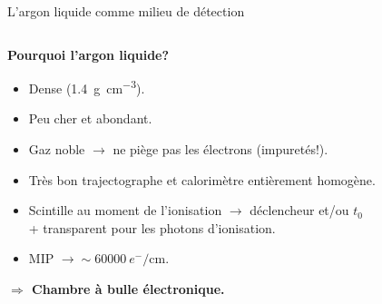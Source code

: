 \begin{frame}{L'argon liquide comme milieu de détection}
\begin{scriptsize}
\begin{columns}
\begin{column}{0.4\textwidth}
\begin{footnotesize}
           				\textbf{Pourquoi l'argon liquide?}
           			\end{footnotesize}
           			\begin{itemize}
           				\item Dense (\SI{1.4}{\gram\per\centi\meter^3}).
           				\item Peu cher et abondant.
           				\item Gaz noble $\rightarrow$ ne piège pas les électrons (\danger impuretés!).
           				\item Très bon trajectographe et calorimètre entièrement homogène.
           				\item Scintille au moment de l'ionisation $\rightarrow$ déclencheur et/ou $t_0$ \\ + transparent pour les photons  d'ionisation.
         				\item MIP $\rightarrow\sim\SI{60000}{e^-\per\centi\meter}$. \\
           			\end{itemize}
           			\begin{footnotesize}
       	    			\textbf{$\Rightarrow$ Chambre à bulle électronique.}
       	    		\end{footnotesize}
           		\end{column}
           	\end{columns}
        \end{scriptsize}
    \end{frame}
        
